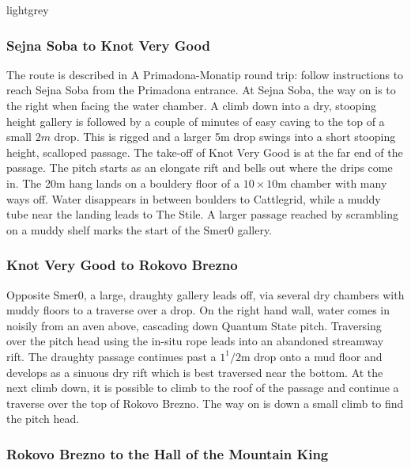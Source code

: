 \begin{colourarticle}{lightgrey}
\end{colourarticle}

\hypertarget{sejna-soba-to-knot-very-good}{%
\subsubsection{Sejna Soba to Knot Very Good}\label{sejna-soba-to-knot-very-good}}

The route is described in A Primadona-Monatip round trip: follow instructions to reach Sejna Soba from the Primadona entrance. At Sejna Soba, the way on is to the right when facing the water chamber. A climb down into a dry, stooping height gallery is followed by a couple of minutes of easy caving to the top of a small \(2m\) drop. This is rigged and a larger 5m drop swings into a short stooping height, scalloped passage. The take-off of Knot Very Good is at the far end of the passage. The pitch starts as an elongate rift and bells out where the drips come in. The 20m hang lands on a bouldery floor of a \(10 \times 10\)m chamber with many ways off. Water disappears in between boulders to Cattlegrid, while a muddy tube near the landing leads to The Stile. A larger passage reached by scrambling on a muddy shelf marks the start of the Smer0 gallery.

\hypertarget{knot-very-good-to-rokovo-brezno}{%
\subsubsection{Knot Very Good to Rokovo Brezno}\label{knot-very-good-to-rokovo-brezno}}

Opposite Smer0, a large, draughty gallery leads off, via several dry chambers with muddy floors to a traverse over a drop. On the right hand wall, water comes in noisily from an aven above, cascading down Quantum State pitch. Traversing over the pitch head using the in-situ rope leads into an abandoned streamway rift. The draughty passage continues past a \(1^1/2\)m drop onto a mud floor and develops as a sinuous dry rift which is best traversed near the bottom. At the next climb down, it is possible to climb to the roof of the passage and continue a traverse over the top of Rokovo Brezno. The way on is down a small climb to find the pitch head.

\hypertarget{rokovo-brezno-to-the-hall-of-the-mountain-king}{%
\subsubsection{Rokovo Brezno to the Hall of the Mountain King}\label{rokovo-brezno-to-the-hall-of-the-mountain-king}}

